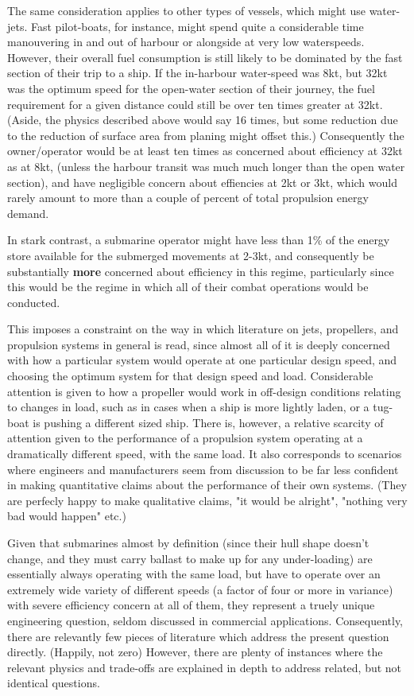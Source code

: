 \documentclass{article}\usepackage[]{graphicx}\usepackage[]{color}
\begin{document}
The same consideration applies to other types of vessels, which might use water-jets.  Fast pilot-boats, for instance, might spend quite a considerable time manouvering in and out of harbour or alongside at very low waterspeeds. However, their overall fuel consumption is still likely to be dominated by the fast section of their trip to a ship.  If the in-harbour water-speed was 8kt, but 32kt was the optimum speed for the open-water section of their journey, the fuel requirement for a given distance could still be over ten times greater at 32kt. (Aside, the physics described above would say 16 times, but some reduction due to the reduction of surface area from planing might offset this.)  Consequently the owner/operator would be at least ten times as concerned about efficiency at 32kt as at 8kt, (unless the harbour transit was much much longer than the open water section), and have negligible concern about effiencies at 2kt or 3kt, which would rarely amount to more than a couple of percent of total propulsion energy demand.

In stark contrast, a submarine operator might have less than 1\% of the energy store available for the submerged movements at 2-3kt, and consequently be substantially \textbf{more} concerned about efficiency in this regime, particularly since this would be the regime in which all of their combat operations would be conducted.

This imposes a constraint on the way in which literature on jets, propellers, and propulsion systems in general is read, since almost all of it is deeply concerned with how a particular system would operate at one particular design speed, and choosing the optimum system for that design speed and load.  Considerable attention is given to how a propeller would work in off-design conditions relating to changes in load, such as in cases when a ship is more lightly laden, or a tug-boat is pushing a different sized ship.  There is, however, a relative scarcity of attention given to the performance of a propulsion system operating at a dramatically different speed, with the same load. It also corresponds to scenarios where engineers and manufacturers seem from discussion to be far less confident in making quantitative claims about the performance of their own systems.  (They are perfecly happy to make qualitative claims, "it would be alright", "nothing very bad would happen" etc.)

Given that submarines almost by definition (since their hull shape doesn't change, and they must carry ballast to make up for any under-loading) are essentially always operating with the same load, but have to operate over an extremely wide variety of different speeds (a factor of four or more in variance) with severe efficiency concern at all of them, they represent a truely unique engineering question, seldom discussed in commercial applications.  Consequently, there are relevantly few pieces of literature which address the present question directly. (Happily, not zero)  However, there are plenty of instances where the relevant physics and trade-offs are explained in depth to address related, but not identical questions.
\end{document}
